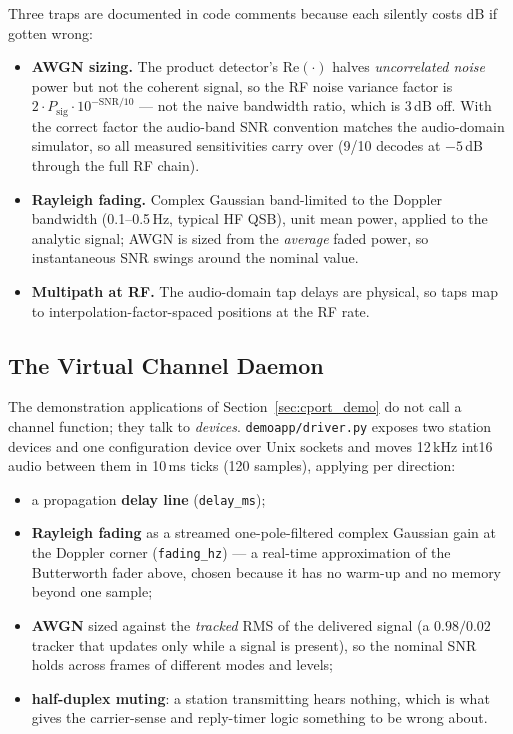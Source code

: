 Three traps are documented in code comments because each silently
costs dB if gotten wrong:

\begin{itemize}
    \item \textbf{AWGN sizing.}  The product detector's
          $\mathrm{Re}(\cdot)$ halves \emph{uncorrelated noise} power
          but not the coherent signal, so the RF noise variance factor
          is $2 \cdot P_{\mathrm{sig}} \cdot 10^{-\mathrm{SNR}/10}$
          --- not the naive bandwidth ratio, which is 3\,dB off.  With
          the correct factor the audio-band SNR convention matches the
          audio-domain simulator, so all measured sensitivities carry
          over (9/10 decodes at $-5$\,dB through the full RF chain).
    \item \textbf{Rayleigh fading.}  Complex Gaussian band-limited to
          the Doppler bandwidth (0.1--0.5\,Hz, typical HF QSB), unit
          mean power, applied to the analytic signal; AWGN is sized
          from the \emph{average} faded power, so instantaneous SNR
          swings around the nominal value.
    \item \textbf{Multipath at RF.}  The audio-domain tap delays are
          physical, so taps map to interpolation-factor-spaced
          positions at the RF rate.
\end{itemize}

\subsection{The Virtual Channel Daemon}
\label{sec:chan_virtual}

The demonstration applications of Section~\ref{sec:cport_demo} do not
call a channel function; they talk to \emph{devices}.
\texttt{demoapp/driver.py} exposes two station devices and one
configuration device over Unix sockets and moves 12\,kHz int16 audio
between them in 10\,ms ticks (120 samples), applying per direction:

\begin{itemize}
    \item a propagation \textbf{delay line} (\texttt{delay\_ms});
    \item \textbf{Rayleigh fading} as a streamed one-pole-filtered
          complex Gaussian gain at the Doppler corner
          (\texttt{fading\_hz}) --- a real-time approximation of the
          Butterworth fader above, chosen because it has no warm-up
          and no memory beyond one sample;
    \item \textbf{AWGN} sized against the \emph{tracked} RMS of the
          delivered signal (a $0.98/0.02$ tracker that updates only
          while a signal is present), so the nominal SNR holds across
          frames of different modes and levels;
    \item \textbf{half-duplex muting}: a station transmitting hears
          nothing, which is what gives the carrier-sense and
          reply-timer logic something to be wrong about.
\end{itemize}

